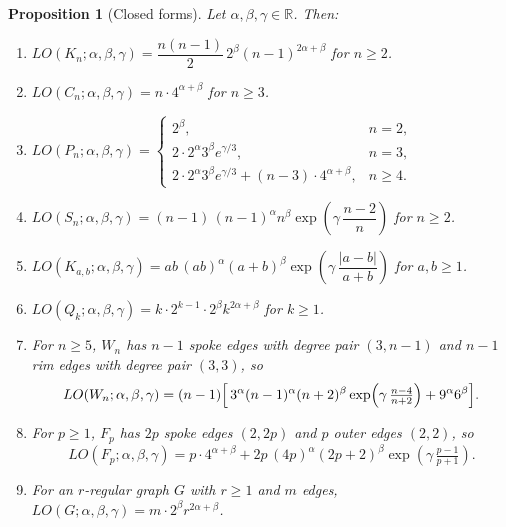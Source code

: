 \documentclass[a5paper, 10pt]{article}
\theoremstyle{plain}
\newtheorem{proposition}[theorem]{Proposition}
\theoremstyle{remark}
\theoremstyle{definition}
\newcommand{\Wuzi}{LO(G;\alpha,\beta,\gamma)}
\begin{document}
  \begin{proposition}[Closed forms]\label{prop:closedforms}
  Let $\alpha, \beta, \gamma \in \mathbb{R}$. Then:
  \begin{enumerate}
  \item  $LO(K_n; \alpha, \beta, \gamma) =
    \dfrac{n(n-1)}{2}\,2^{\beta}(n - 1)^{2\alpha + \beta}$ for $n \ge 2$.
  \item  $LO(C_n; \alpha, \beta, \gamma) = n \cdot 4^{\alpha +
  \beta}$
    for $n \ge 3$.
  \item
    $LO(P_n; \alpha, \beta, \gamma) =
    \begin{cases}
      2^{\beta}, & n = 2,\\[2pt]
      2 \cdot 2^{\alpha} 3^{\beta} e^{\gamma/3}, & n = 3,\\[2pt]
      2 \cdot 2^{\alpha} 3^{\beta} e^{\gamma/3} + (n - 3) \cdot 4^{\alpha +
  \beta},
         & n \ge 4.
    \end{cases}$
  \item  $LO(S_n; \alpha, \beta, \gamma) =
    (n - 1)\,(n - 1)^{\alpha} n^{\beta} \exp\!\left(\gamma\,\dfrac{n -
  2}{n}\right)$
    for $n \ge 2$.
  \item  $LO(K_{a,b}; \alpha, \beta, \gamma) =
    ab\,(ab)^{\alpha}(a + b)^{\beta}\exp\!\left(\gamma\,\dfrac{|a - b|}{a +
  b}\right)$ for $a, b \ge 1$.
  \item  $LO(Q_k; \alpha, \beta, \gamma) =
    k \cdot 2^{k - 1} \cdot 2^{\beta} k^{2\alpha + \beta}$ for $k \ge 1$.
  \item  For $n \ge 5$, $W_n$ has $n - 1$ spoke edges with
    degree pair $(3, n - 1)$ and $n - 1$ rim edges with degree pair
    $(3, 3)$, so
    \[
    LO(W_n; \alpha, \beta, \gamma)
    = (n - 1)\Bigl[\,3^{\alpha} (n - 1)^{\alpha}(n + 2)^{\beta}
         \exp\!\left(\gamma\,\tfrac{n - 4}{n + 2}\right)
       + 9^{\alpha} 6^{\beta}\Bigr].
    \]
  \item  For $p \ge 1$, $F_p$ has $2p$ spoke edges
    $(2, 2p)$ and $p$ outer edges $(2, 2)$, so
    \[
    LO(F_p; \alpha, \beta, \gamma)
    = p \cdot 4^{\alpha + \beta}
     + 2p\,(4p)^{\alpha}(2p + 2)^{\beta}
         \exp\!\left(\gamma\,\tfrac{p - 1}{p + 1}\right).
    \]
  \item  For an $r$-regular graph $G$ with $r \ge 1$ and $m$ edges,
    $\Wuzi = m \cdot 2^{\beta} r^{2\alpha + \beta}$.
  \end{enumerate}
  \end{proposition}
\end{document}
